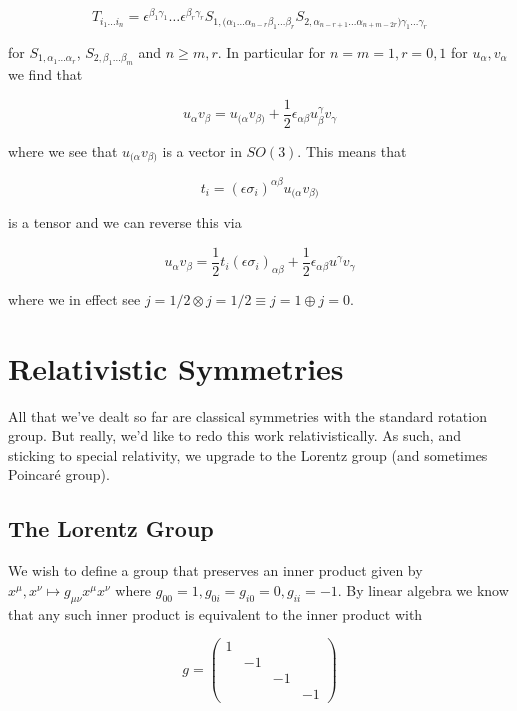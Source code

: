 \documentclass{article}
\theoremstyle{definition}
\begin{document}
$$ T_{i_1 \dots i_n} = \epsilon^{\beta_1 \gamma_1} \dots \epsilon^{\beta_r
  \gamma_r} S_{1, (\alpha_1 \dots \alpha_{n - r} \beta_1 \dots \beta_r} S_{2,
  \alpha_{n - r + 1} \dots \alpha_{n + m - 2r})\gamma_1 \dots \gamma_r} $$

for $S_{1, \alpha_1 \dots \alpha_r}$, $S_{2, \beta_1 \dots \beta_m}$ and $n \geq
m, r$. In particular for $n=m=1, r=0, 1$ for $u_\alpha, v_\alpha$ we find that

$$ u_\alpha v_\beta = u_{(\alpha} v_{\beta)} + \frac{1}{2} \epsilon_{\alpha
  \beta} u_\beta^\gamma v_\gamma $$

where we see that $u_{(\alpha} v_{\beta)}$ is a vector in $SO(3)$. This means
that

$$ t_i = (\epsilon \sigma_i)^{\alpha \beta} u_{(\alpha} v_{\beta)} $$

is a tensor and we can reverse this via

$$ u_\alpha v_\beta = \frac{1}{2} t_i (\epsilon \sigma_i)_{\alpha \beta} +
\frac{1}{2} \epsilon_{\alpha \beta} u^\gamma v_\gamma $$

where we in effect see $j = 1 / 2 \otimes j = 1/2 \equiv j = 1 \oplus j = 0$.

\section{Relativistic Symmetries}

All that we've dealt so far are classical symmetries with the standard rotation
group. But really, we'd like to redo this work relativistically. As such, and
sticking to special relativity, we upgrade to the Lorentz group (and sometimes
Poincar\'{e} group). 

\subsection{The Lorentz Group}

We wish to define a group that preserves an inner product given by $x^\mu, x^\nu
\mapsto g_{\mu \nu} x^\mu x^\nu$ where $g_{00} = 1, g_{0i} = g_{i0} = 0, g_{ii}
= -1$. By linear algebra we know that any such inner product is equivalent to
the inner product with 

$$ g = 
\begin{pmatrix}
1 & & & \\
& -1 & & \\
& & -1 & \\
& & & -1
\end{pmatrix} $$
\end{document}
